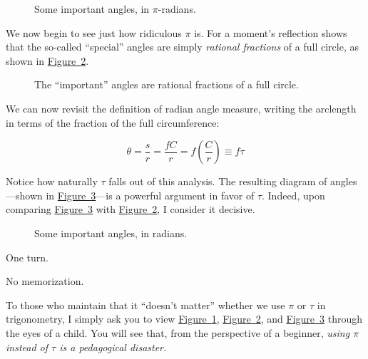 \documentclass{article}
\begin{document}
\begin{figure}
\begin{center}
\end{center}
\caption{Some important angles, in $\pi$-radians.\label{fig:pi-angles}}
\end{figure}

We now begin to see just how ridiculous $\pi$ is. For a moment's reflection shows that the so-called ``special'' angles are simply  \emph{rational fractions} of a full circle, as shown in \hyperref[fig:angle-fractions]{Figure~}\ref{fig:angle-fractions}.

\begin{figure}
\begin{center}
\end{center}
\caption{The ``important'' angles are rational fractions of a full circle.\label{fig:angle-fractions}}
\end{figure}

\noindent We can now revisit the definition of radian angle measure, writing the arclength in terms of the fraction of the full circumference:

\[ \theta = \frac{s}{r} = \frac{fC}{r} =  f\left(\frac{C}{r}\right) \equiv f\tau \]

\noindent Notice how naturally $\tau$ falls out of this analysis. The resulting diagram of angles---shown in \hyperref[fig:tau-angles]{Figure~}\ref{fig:tau-angles}---is a powerful argument in favor of $\tau$.
Indeed, upon comparing \hyperref[fig:tau-angles]{Figure~}\ref{fig:tau-angles} with \hyperref[fig:angle-fractions]{Figure~}\ref{fig:angle-fractions}, I consider it decisive.

\begin{figure}
\begin{center}
\end{center}
\caption{Some important angles, in radians.\label{fig:tau-angles}}
\end{figure}

One turn.

No memorization.

To those who maintain that it ``doesn't matter'' whether we use $\pi$ or $\tau$ in trigonometry, I simply ask you to view \hyperref[fig:pi-angles]{Figure~}\ref{fig:pi-angles}, \hyperref[fig:angle-fractions]{Figure~}\ref{fig:angle-fractions}, and \hyperref[fig:tau-angles]{Figure~}\ref{fig:tau-angles} through the eyes of a child. You will see that, from the perspective of a beginner, \emph{using $\pi$ instead of $\tau$ is a pedagogical disaster.}
\end{document}
